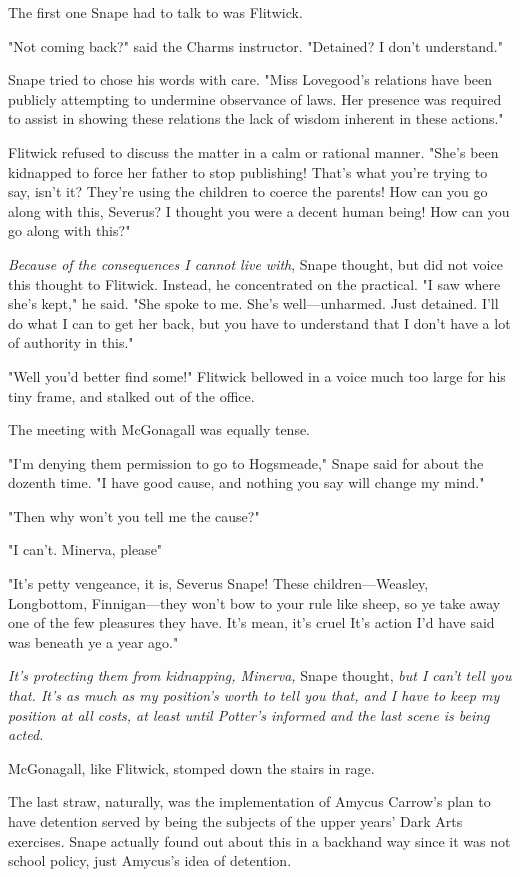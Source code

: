 The first one Snape had to talk to was Flitwick.

"Not coming back?" said the Charms instructor. "Detained? I don't understand."

Snape tried to chose his words with care. "Miss Lovegood's relations have been publicly attempting to undermine observance of laws. Her presence was required to assist in showing these relations the lack of wisdom inherent in these actions."

Flitwick refused to discuss the matter in a calm or rational manner. "She's been kidnapped to force her father to stop publishing! That's what you're trying to say, isn't it? They're using the children to coerce the parents! How can you go along with this, Severus? I thought you were a decent human being! How can you go along with this?"

\emph{Because of the consequences I cannot live with}, Snape thought, but did not voice this thought to Flitwick. Instead, he concentrated on the practical. "I saw where she's kept," he said. "She spoke to me. She's well—unharmed. Just detained. I'll do what I can to get her back, but you have to understand that I don't have a lot of authority in this."

"Well you'd better find some!" Flitwick bellowed in a voice much too large for his tiny frame, and stalked out of the office.

The meeting with McGonagall was equally tense.

"I'm denying them permission to go to Hogsmeade," Snape said for about the dozenth time. "I have good cause, and nothing you say will change my mind."

"Then why won't you tell me the cause?"

"I can't. Minerva, please{\el}"

"It's petty vengeance, it is, Severus Snape! These children—Weasley, Longbottom, Finnigan—they won't bow to your rule like sheep, so ye take away one of the few pleasures they have. It's mean, it's cruel{\el} It's action I'd have said was beneath ye a year ago."

\emph{It's protecting them from kidnapping, Minerva,} Snape thought, \emph{but I can't tell you that. It's as much as my position's worth to tell you that, and I have to keep my position at all costs, at least until Potter's informed and the last scene is being acted.}

McGonagall, like Flitwick, stomped down the stairs in rage.

The last straw, naturally, was the implementation of Amycus Carrow's plan to have detention served by being the subjects of the upper years' Dark Arts exercises. Snape actually found out about this in a backhand way since it was not school policy, just Amycus's idea of detention.

